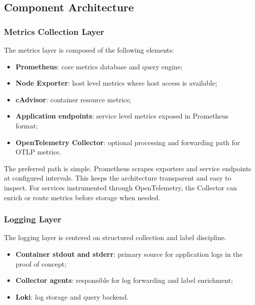 \subsection{Component Architecture}
\label{subsec:component_architecture}

\subsubsection{Metrics Collection Layer}
\label{subsubsec:metrics_layer}

The metrics layer is composed of the following elements:
\begin{itemize}
    \item \textbf{Prometheus}: core metrics database and query engine;
    \item \textbf{Node Exporter}: host level metrics where host access is available;
    \item \textbf{cAdvisor}: container resource metrics;
    \item \textbf{Application endpoints}: service level metrics exposed in Prometheus format;
    \item \textbf{OpenTelemetry Collector}: optional processing and forwarding path for OTLP metrics.
\end{itemize}

The preferred path is simple. Prometheus scrapes exporters and service endpoints at configured intervals. This keeps the architecture transparent and easy to inspect. For services instrumented through OpenTelemetry, the Collector can enrich or route metrics before storage when needed.

\subsubsection{Logging Layer}
\label{subsubsec:logging_layer}

The logging layer is centered on structured collection and label discipline.

\begin{itemize}
    \item \textbf{Container stdout and stderr}: primary source for application logs in the proof of concept;
    \item \textbf{Collector agents}: responsible for log forwarding and label enrichment;
    \item \textbf{Loki}: log storage and query backend.
\end{itemize}

